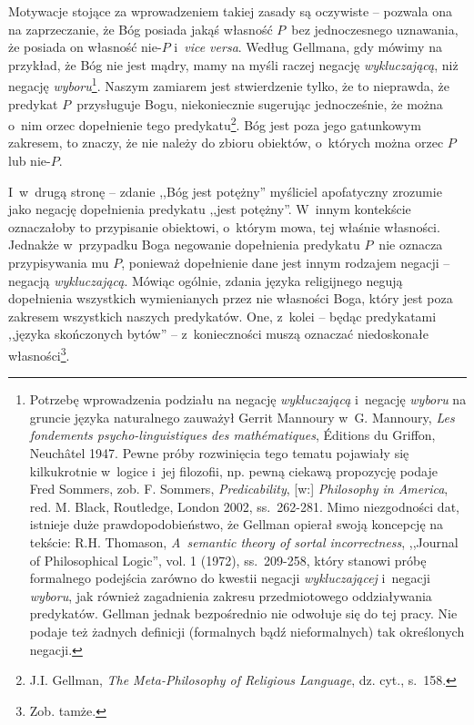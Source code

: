 Motywacje stojące za wprowadzeniem takiej zasady są oczywiste -- pozwala ona na zaprzeczanie, że Bóg posiada jakąś własność $P$~bez jednoczesnego uznawania, że posiada on własność nie-$P$ i~\textit{vice versa}. Według Gellmana, gdy mówimy na przykład, że Bóg nie jest mądry, mamy na myśli raczej negację \textit{wykluczającą}, niż negację \textit{wyboru}\footnote{Potrzebę wprowadzenia podziału na negację \textit{wykluczającą} i~negację \textit{wyboru} na gruncie języka naturalnego zauważył Gerrit Mannoury w~G. Mannoury, \textit{Les fondements psycho-linguistiques des mathématiques}, Éditions du Griffon, Neuchâtel 1947. Pewne próby rozwinięcia tego tematu pojawiały się kilkukrotnie w~logice i~jej filozofii, np. pewną ciekawą propozycję podaje Fred Sommers, zob. F. Sommers, \textit{Predicability}, [w:] \textit{Philosophy in America}, red. M. Black, Routledge, London 2002, ss.~262-281. Mimo niezgodności dat, istnieje duże prawdopodobieństwo, że Gellman opierał swoją koncepcję na tekście: R.H. Thomason, \textit{A~semantic theory of sortal incorrectness}, ,,Journal of Philosophical Logic'', vol. 1 (1972), ss.~209-258, który stanowi próbę formalnego podejścia zarówno do kwestii negacji \textit{wykluczającej} i~negacji \textit{wyboru}, jak również zagadnienia zakresu przedmiotowego oddziaływania predykatów. Gellman jednak bezpośrednio nie odwołuje się do tej pracy. Nie podaje też żadnych definicji (formalnych bądź nieformalnych) tak określonych negacji.}. Naszym zamiarem jest stwierdzenie tylko, że to nieprawda, że predykat $P$~przysługuje Bogu, niekoniecznie sugerując jednocześnie, że można o~nim orzec dopełnienie tego predykatu\footnote{J.I. Gellman, \textit{The Meta-Philosophy of Religious Language}, dz. cyt., s.~158.}. Bóg jest poza jego gatunkowym zakresem, to znaczy, że nie należy do zbioru obiektów, o~których można orzec $P$ lub nie-$P$.

I~w~drugą stronę -- zdanie ,,Bóg jest potężny'' myśliciel apofatyczny zrozumie jako negację dopełnienia predykatu ,,jest potężny''. W~innym kontekście oznaczałoby to przypisanie obiektowi, o~którym mowa, tej właśnie własności. Jednakże w~przypadku Boga negowanie dopełnienia predykatu $P$~nie oznacza przypisywania mu $P$, ponieważ dopełnienie dane jest innym rodzajem negacji -- negacją \textit{wykluczającą}. Mówiąc ogólnie, zdania języka religijnego negują dopełnienia wszystkich wymienianych przez nie własności Boga, który jest poza zakresem wszystkich naszych predykatów. One, z~kolei -- będąc predykatami ,,języka skończonych bytów'' -- z~konieczności muszą oznaczać niedoskonałe własności\footnote{Zob. tamże.}.

